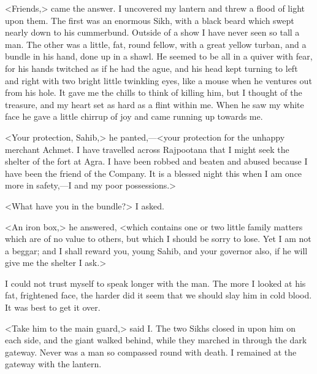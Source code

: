 <Friends,> came the answer. I uncovered my lantern and threw a flood of light upon them. The first was an enormous Sikh, with a black beard which swept nearly down to his cummerbund. Outside of a show I have never seen so tall a man. The other was a little, fat, round fellow, with a great yellow turban, and a bundle in his hand, done up in a shawl. He seemed to be all in a quiver with fear, for his hands twitched as if he had the ague, and his head kept turning to left and right with two bright little twinkling eyes, like a mouse when he ventures out from his hole. It gave me the chills to think of killing him, but I thought of the treasure, and my heart set as hard as a flint within me. When he saw my white face he gave a little chirrup of joy and came running up towards me.

<Your protection, Sahib,> he panted,—<your protection for the unhappy merchant Achmet. I have travelled across Rajpootana that I might seek the shelter of the fort at Agra. I have been robbed and beaten and abused because I have been the friend of the Company. It is a blessed night this when I am once more in safety,—I and my poor possessions.>

<What have you in the bundle?> I asked.

<An iron box,> he answered, <which contains one or two little family matters which are of no value to others, but which I should be sorry to lose. Yet I am not a beggar; and I shall reward you, young Sahib, and your governor also, if he will give me the shelter I ask.>

I could not trust myself to speak longer with the man. The more I looked at his fat, frightened face, the harder did it seem that we should slay him in cold blood. It was best to get it over.

<Take him to the main guard,> said I\@. The two Sikhs closed in upon him on each side, and the giant walked behind, while they marched in through the dark gateway. Never was a man so compassed round with death. I remained at the gateway with the lantern.

